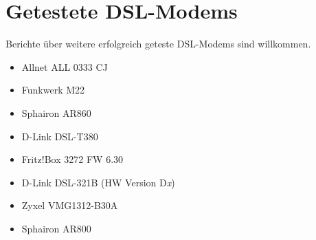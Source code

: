 \section{Getestete DSL-Modems}
  Berichte über weitere erfolgreich geteste DSL-Modems sind willkommen.
  
\begin{itemize}
\item Allnet ALL 0333 CJ
\end{itemize}

\begin{itemize}
\item Funkwerk M22
\item Sphairon AR860
\item D-Link DSL-T380
\end{itemize}

\begin{itemize}
\item Fritz!Box 3272 FW 6.30
\end{itemize}

\begin{itemize}
\item D-Link DSL-321B
(HW Version D\emph{x})
\item Zyxel VMG1312-B30A
\end{itemize}

\begin{itemize}
\item Sphairon AR800
\end{itemize}

